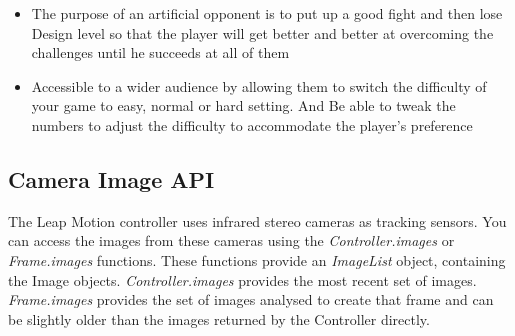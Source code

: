 \documentclass[journal]{IEEEtran}										    %
\begin{document}
\begin{itemize}
                    \item   The purpose of an artificial opponent is to put up a good 
                    fight and then lose Design level so that the player will get better 
                    and better at overcoming the challenges until he succeeds at all of them

                    \item Accessible to a wider audience by allowing them to switch the difficulty 
                    of your game to easy, normal or hard setting. And Be able to tweak the numbers 
                    to adjust the difficulty to accommodate the player's preference

                \end{itemize}



            \subsection{Camera Image API}
                The Leap Motion controller uses infrared stereo cameras
                as tracking sensors. You can access the images from 
                these cameras using the \emph{Controller.images} or 
                \emph{Frame.images} functions. These functions provide 
                an \emph{ImageList} object, containing the Image objects. 
                \emph{Controller.images} provides the most recent set of images. 
                \emph{Frame.images} provides the set of images analysed to 
                create that frame and can be slightly older than the 
                images returned by the Controller directly. \\
\end{document}
